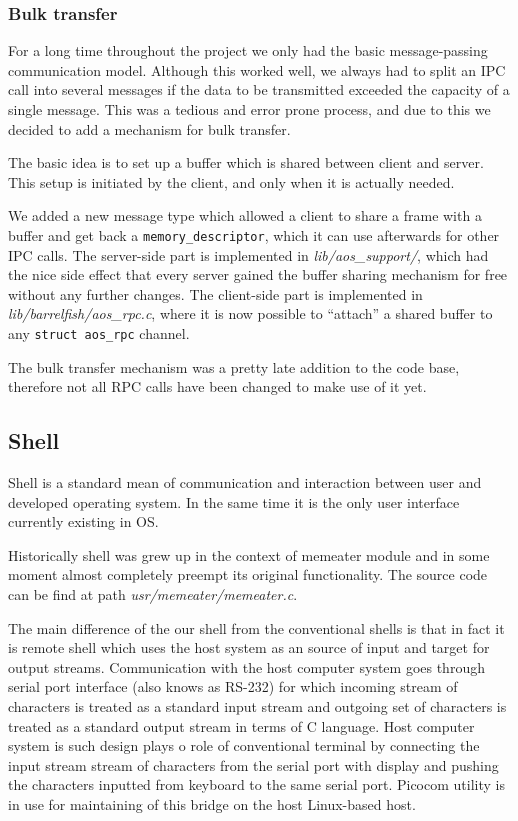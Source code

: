 \documentclass[a4paper,10pt]{article}
\newcommand{\filepath}[1]{\emph{ #1}}
\begin{document}
\subsubsection{Bulk transfer}

For a long time throughout the project we only had the basic message-passing communication model.
Although this worked well, we always had to split an IPC call into several messages if the data to be transmitted exceeded the capacity of a single message.
This was a tedious and error prone process, and due to this we decided to add a mechanism for bulk transfer.

The basic idea is to set up a buffer which is shared between client and server.
This setup is initiated by the client, and only when it is actually needed.

We added a new message type which allowed a client to share a frame with a buffer and get back a \lstinline!memory_descriptor!, which it can use afterwards for other IPC calls.
The server-side part is implemented in \filepath{lib/aos\_support/}, which had the nice side effect that every server gained the buffer sharing mechanism for free without any further changes.
The client-side part is implemented in \filepath{lib/barrelfish/aos\_rpc.c}, where it is now possible to ``attach'' a shared buffer to any \lstinline!struct aos_rpc! channel.

The bulk transfer mechanism was a pretty late addition to the code base, therefore not all RPC calls have been changed to make use of it yet.


\subsection{Shell}
	Shell is a standard mean of communication and interaction between user and developed operating system.
	In the same time it is the only user interface currently existing in OS.
	 
	Historically shell was grew up in the context of memeater module and in some moment almost completely preempt its original functionality. The source code can be find at path \filepath{usr/memeater/memeater.c}.
	
	The main difference of the our shell from the conventional shells is that in fact it is remote shell which uses the host system as an source of input and target for output streams. 
	Communication with the host computer system goes through serial port interface (also knows as RS-232) for which incoming stream of characters is treated as a standard input stream and outgoing set of characters is treated as a standard output stream in terms of C language. 
	Host computer system is such design plays o role of conventional terminal by connecting the input stream stream of characters from the serial port with display and pushing the characters inputted from keyboard to the same serial port.
	Picocom utility is in use for maintaining of this bridge on the host Linux-based host.
	
\end{document}
